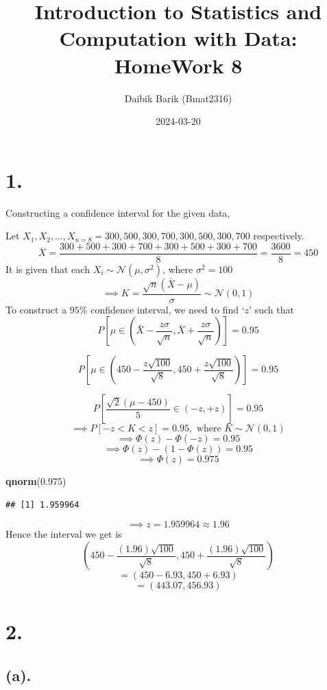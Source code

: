 \documentclass[
]{article}
\title{\textbf{Introduction to Statistics and Computation with Data:
HomeWork 8}}
\author{Daibik Barik (Bmat2316)}
\date{2024-03-20}
\newenvironment{Shaded}{\begin{snugshade}}{\end{snugshade}}
\newcommand{\FloatTok}[1]{\textcolor[rgb]{0.00,0.00,0.81}{#1}}
\newcommand{\FunctionTok}[1]{\textcolor[rgb]{0.13,0.29,0.53}{\textbf{#1}}}
\newcommand{\NormalTok}[1]{#1}
\begin{document}
\maketitle

\section*{1. }

Constructing a confidence interval for the given data,

Let \(X_1, X_2, \dots, X_{n=8} = 300,500,300,700,300,500,300,700\)
respectively.
\[\overline X = \frac{300+500+300+700+300+500+300+700}{8} = \frac{3600}{8} = 450\]
It is given that each \(X_i \sim \mathcal{N}(\mu, \sigma^2)\), where
\(\sigma^2 = 100\)
\[\implies K =\frac{\sqrt{n}(\bar{X} - \mu)}{\sigma} \sim \mathcal{N}(0,1)\]
To construct a \(95\%\) confidence interval, we need to find `\(z\)'
such that
\[P\left[\mu \in \left(\bar X - \frac{z\sigma}{\sqrt{n}},\bar X + \frac{z\sigma}{\sqrt{n}}\right)\right] = 0.95\]

\[P\left[\mu \in \left(450 - \frac{z\sqrt{100}}{\sqrt{8}},450 + \frac{z\sqrt{100}}{\sqrt{8}} \right) \right] = 0.95\]

\[P\left[\frac{\sqrt{2}(\mu - 450)}{5} \in \left( - z,+ z \right) \right] = 0.95\]
\[\implies P[-z< K < z] = 0.95, \text{ where } K \sim \mathcal{N}(0,1) \]
\[\implies \Phi(z) - \Phi(-z) = 0.95\]
\[\implies \Phi(z) - (1 - \Phi(z)) = 0.95\] \[\implies \Phi(z) = 0.975\]

\begin{Shaded}
\begin{Highlighting}[]
\FunctionTok{qnorm}\NormalTok{(}\FloatTok{0.975}\NormalTok{)}
\end{Highlighting}
\end{Shaded}

\begin{verbatim}
## [1] 1.959964
\end{verbatim}

\[\implies z = 1.959964 \approx 1.96\] Hence the interval we get is
\[\left(450 - \frac{(1.96)\sqrt{100}}{\sqrt{8}},450 + \frac{(1.96)\sqrt{100}}{\sqrt{8}} \right)\]
\[ = \left( 450 - 6.93,450 + 6.93 \right)\]
\[ = \left( 443.07,456.93\right)\]

\section*{2. }

\subsection*{(a). }
\end{document}
